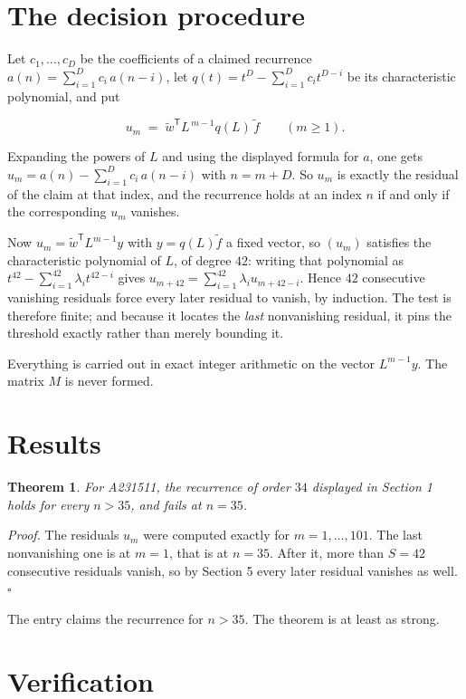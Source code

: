 \documentclass[11pt]{article}
\newtheorem{theorem}{Theorem}
\theoremstyle{definition}
\begin{document}
\section{The decision procedure}

Let $c_1,\dots,c_D$ be the coefficients of a claimed recurrence $a(n) = \sum_{i=1}^{D} c_i\,a(n-i)$, let $q(t) = t^{D} - \sum_{i=1}^{D} c_i t^{D-i}$ be its characteristic polynomial, and put

\[u_m \;=\; \tilde w^{\mathsf T} L^{\,m-1} q(L)\,\tilde f \qquad (m \ge 1).\]

Expanding the powers of $L$ and using the displayed formula for $a$, one gets $u_m = a(n) - \sum_{i=1}^{D} c_i\,a(n-i)$ with $n = m + D$. So $u_m$ is exactly the residual of the claim at that index, and the recurrence holds at an index $n$ if and only if the corresponding $u_m$ vanishes.

Now $u_m = \tilde w^{\mathsf T} L^{m-1} y$ with $y = q(L)\tilde f$ a fixed vector, so $(u_m)$ satisfies the characteristic polynomial of $L$, of degree $42$: writing that polynomial as $t^{42} - \sum_{i=1}^{42} \lambda_i t^{42-i}$ gives $u_{m+42} = \sum_{i=1}^{42} \lambda_i u_{m+42-i}$. Hence $42$ consecutive vanishing residuals force every later residual to vanish, by induction. The test is therefore finite; and because it locates the {\itshape last} nonvanishing residual, it pins the threshold exactly rather than merely bounding it.

Everything is carried out in exact integer arithmetic on the vector $L^{m-1}y$. The matrix $M$ is never formed.

\section{Results}

\begin{theorem} For A231511, the recurrence of order $34$ displayed in Section 1 holds for every $n > 35$, and fails at $n = 35$.\end{theorem}

{\itshape Proof.} The residuals $u_m$ were computed exactly for $m = 1,\dots,101$. The last nonvanishing one is at $m = 1$, that is at $n = 35$. After it, more than $S = 42$ consecutive residuals vanish, so by Section 5 every later residual vanishes as well. $\square$

The entry claims the recurrence for $n > 35$. The theorem is at least as strong.

\section{Verification}
\end{document}
